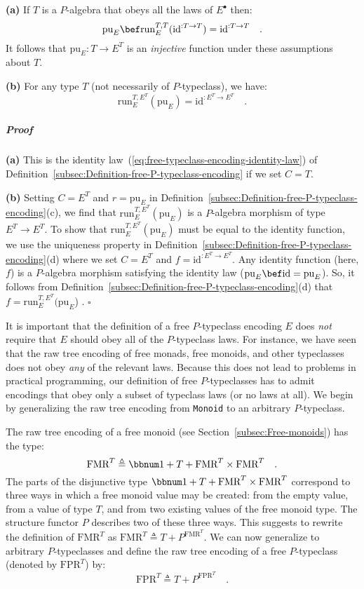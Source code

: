 \textbf{(a)} If $T$ is a $P$-algebra that obeys all the laws of
$E^{\bullet}$ then: 
\[
\text{pu}_{E}\bef\text{run}_{E}^{T,T}(\text{id}^{:T\rightarrow T})=\text{id}^{:T\rightarrow T}\quad.
\]
It follows that $\text{pu}_{E}:T\rightarrow E^{T}$ is an \emph{injective}
function under these assumptions about $T$.

\textbf{(b)} For any type $T$ (not necessarily of $P$-typeclass),
we have:
\[
\text{run}_{E}^{T,E^{T}}(\text{pu}_{E})=\text{id}^{:E^{T}\rightarrow E^{T}}\quad.
\]


\subparagraph{Proof}

\textbf{(a)} This is the identity law~(\ref{eq:free-typeclass-encoding-identity-law})
of Definition~\ref{subsec:Definition-free-P-typeclass-encoding}
if we set $C=T$.

\textbf{(b)} Setting $C=E^{T}$ and $r=\text{pu}_{E}$ in Definition~\ref{subsec:Definition-free-P-typeclass-encoding}(c),
we find that $\text{run}_{E}^{T,E^{T}}(\text{pu}_{E})$ is a $P$-algebra
morphism of type $E^{T}\rightarrow E^{T}$. To show that $\text{run}_{E}^{T,E^{T}}(\text{pu}_{E})$
must be equal to the identity function, we use the uniqueness property
in Definition~\ref{subsec:Definition-free-P-typeclass-encoding}(d)
where we set $C=E^{T}$ and $f=\text{id}^{:E^{T}\rightarrow E^{T}}$.
Any identity function (here, $f$) is a $P$-algebra morphism satisfying
the identity law ($\text{pu}_{E}\bef\text{id}=\text{pu}_{E}$). So,
it follows from Definition~\ref{subsec:Definition-free-P-typeclass-encoding}(d)
that $f=\text{run}_{E}^{T,E^{T}}(\text{pu}_{E}$) . $\square$

It is important that the definition of a free $P$-typeclass encoding
$E$ does \emph{not} require that $E$ should obey all of the $P$-typeclass
laws. For instance, we have seen that the raw tree encoding of free
monads, free monoids, and other typeclasses does not obey \emph{any}
of the relevant laws. Because this does not lead to problems in practical
programming, our definition of free $P$-typeclasses has to admit
encodings that obey only a subset of typeclass laws (or no laws at
all). We begin by generalizing the raw tree encoding from \lstinline!Monoid!
to an arbitrary $P$-typeclass. 

The raw tree encoding of a free monoid (see Section~\ref{subsec:Free-monoids})
has the type: 
\[
\text{FMR}^{T}\triangleq\bbnum 1+T+\text{FMR}^{T}\times\text{FMR}^{T}\quad.
\]
The parts of the disjunctive type $\bbnum 1+T+\text{FMR}^{T}\times\text{FMR}^{T}$
correspond to three ways in which a free monoid value may be created:
from the empty value, from a value of type $T$, and from two existing
values of the free monoid type. The structure functor $P$ describes
two of these three ways. This suggests to rewrite the definition of
$\text{FMR}^{T}$ as $\text{FMR}^{T}\triangleq T+P^{\text{FMR}^{T}}$.
We can now generalize to arbitrary $P$-typeclasses and define the
raw tree encoding of a free $P$-typeclass (denoted by $\text{FPR}^{T}$)
by:
\[
\text{FPR}^{T}\triangleq T+P^{\text{FPR}^{T}}\quad.
\]


